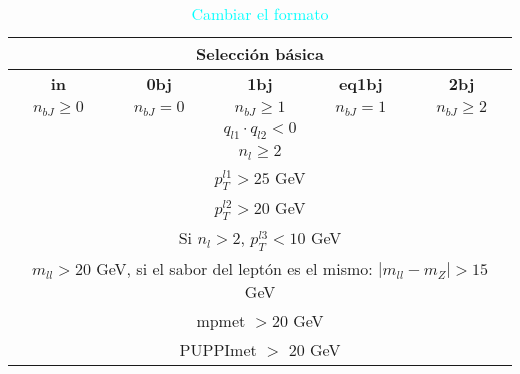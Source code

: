 \begin{table}[h!]
\centering
\begin{tabular}{|ccccc|}
\hline
\multicolumn{5}{|c|}{\textbf{Selección básica}}                                                                               \\ \hline

\multicolumn{1}{|c|}{\textbf{in}} & \multicolumn{1}{c|}{\textbf{0bj}}          & \multicolumn{1}{c|}{\textbf{1bj}}            & \multicolumn{1}{c|}{\textbf{eq1bj}}        & \multicolumn{1}{c|}{\textbf{2bj}}          \\ \hline

\multicolumn{1}{|c|}{$n_{bJ} \ge 0$} & \multicolumn{1}{c|}{$n_{bJ} = 0$} & \multicolumn{1}{c|}{$n_{bJ} \ge 1$} & \multicolumn{1}{c|}{$n_{bJ} = 1$} & \multicolumn{1}{c|}{$n_{bJ} \ge 2$}    \\ \hline
\multicolumn{5}{|c|}{$q_{l1} \cdot q_{l2} < 0$}                                                                                 \\ \hline
\multicolumn{5}{|c|}{$n_l \ge 2$}                                                                                             \\ \hline
\multicolumn{5}{|c|}{$p_T^{l1} > 25 $ GeV}                                                                                       \\ \hline
\multicolumn{5}{|c|}{$p_T^{l2} > 20 $ GeV}                                                                                       \\ \hline
\multicolumn{5}{|c|}{Si $n_l > 2$, $p_T^{l3} < 10$ GeV}                                                                          \\ \hline
\multicolumn{5}{|c|}{$m_{ll}> 20$ GeV, si el sabor del leptón es el mismo: $|m_{ll}-m_Z| > 15 $ GeV}                           \\ \hline
\multicolumn{5}{|c|}{mpmet $> 20$ GeV}                                                                                        \\ \hline
\multicolumn{5}{|c|}{PUPPImet $>$ 20 GeV}                                                                                     \\ \hline

\end{tabular}
\caption{\textcolor{cyan}{Cambiar el formato}}
\label{tab:preseleccion_basica}
\end{table} 



